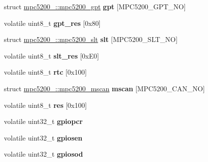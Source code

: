 \begin{DoxyCompactItemize}
struct \mbox{\hyperlink{structmpc5200___1_1mpc5200__gpt}{mpc5200\+\_\+\+::mpc5200\+\_\+gpt}} {\bfseries gpt} \mbox{[}M\+P\+C5200\+\_\+\+G\+P\+T\+\_\+\+NO\mbox{]}
\item 
\mbox{\label{structmpc5200___a99a1d2733bc42316352edac69259e606}} 
volatile uint8\+\_\+t {\bfseries gpt\+\_\+res} \mbox{[}0x80\mbox{]}
\item 
\mbox{\label{structmpc5200___ac38d690b7d494563c91ee2935b346cf1}} 
struct \mbox{\hyperlink{structmpc5200___1_1mpc5200__slt}{mpc5200\+\_\+\+::mpc5200\+\_\+slt}} {\bfseries slt} \mbox{[}M\+P\+C5200\+\_\+\+S\+L\+T\+\_\+\+NO\mbox{]}
\item 
\mbox{\label{structmpc5200___ad007bd6ed57af596736e23f1ed0ea8fa}} 
volatile uint8\+\_\+t {\bfseries slt\+\_\+res} \mbox{[}0x\+E0\mbox{]}
\item 
\mbox{\label{structmpc5200___a0782acb70c7b191132a0c42e7569e3d2}} 
volatile uint8\+\_\+t {\bfseries rtc} \mbox{[}0x100\mbox{]}
\item 
\mbox{\label{structmpc5200___a14cd18d033b209cdde900cce3edf991b}} 
struct \mbox{\hyperlink{structmpc5200___1_1mpc5200__mscan}{mpc5200\+\_\+\+::mpc5200\+\_\+mscan}} {\bfseries mscan} \mbox{[}M\+P\+C5200\+\_\+\+C\+A\+N\+\_\+\+NO\mbox{]}
\item 
\mbox{\label{structmpc5200___a3693c17bf2862a99fa437ef4464e2a1d}} 
volatile uint8\+\_\+t {\bfseries res} \mbox{[}0x100\mbox{]}
\item 
\mbox{\label{structmpc5200___afe2012b08908f12c24b0a2dbe244dfab}} 
volatile uint32\+\_\+t {\bfseries gpiopcr}
\item 
\mbox{\label{structmpc5200___a0c535d791429aa061eec4e6be11551e0}} 
volatile uint32\+\_\+t {\bfseries gpiosen}
\item 
\mbox{\label{structmpc5200___aaeefdf7c49098752e160669433e5e966}} 
volatile uint32\+\_\+t {\bfseries gpiosod}
\item 
\mbox{\label{structmpc5200___a8495a6014d9a76774de0afab17fe5e21}} 

\end{DoxyCompactItemize}
